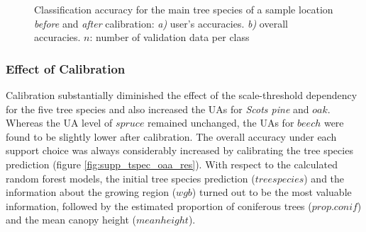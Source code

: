 \begin{figure}[H]
\centering
{}\par\medskip
{}\par\medskip
\caption{Classification accuracy for the main tree species of a sample location \textit{before} and \textit{after} calibration: \textit{a)} user's accuracies. \textit{b)} overall accuracies. $n$: number of validation data per class}
\label{fig:cos_oaa_ua}
\end{figure}


\subsubsection*{Effect of Calibration}
Calibration substantially diminished the effect of the scale-threshold dependency for the five tree species and also increased the UAs for \textit{Scots pine} and $oak$. Whereas the UA level of $spruce$ remained unchanged, the UAs for $beech$ were found to be slightly lower after calibration. The overall accuracy under each support choice was always considerably increased by calibrating the tree species prediction (figure \ref{fig:supp_tspec_oaa_res}). With respect to the calculated random forest models, the initial tree species prediction ($treespecies$) and the information about the growing region ($wgb$) turned out to be the most valuable information, followed by the estimated proportion of coniferous trees ($prop.conif$) and the mean canopy height ($meanheight$).


